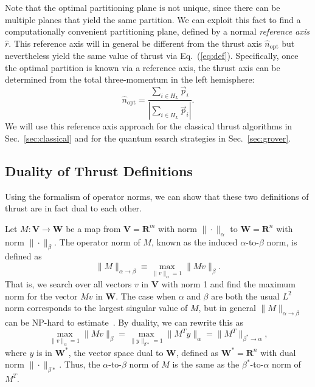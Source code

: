 \documentclass[aps,prd,twocolumn,superscriptaddress,preprintnumbers,nofootinbib,longbibliography,floatfix]{revtex4-1}
\DeclareRobustCommand{\Sec}[1]{Sec.~\ref{#1}}
\DeclareRobustCommand{\Eq}[1]{Eq.~(\ref{#1})}
\newcommand{\opt}{\text{opt}}
\begin{document}
Note that the optimal partitioning plane is not unique, since there can be multiple planes that yield the same partition.
%
We can exploit this fact to find a computationally convenient partitioning plane, defined by a normal \emph{reference axis} $\hat{r}$.
%
This reference axis will in general be different from the thrust axis $\hat{n}_\opt$ but nevertheless yield the same value of thrust via \Eq{eq:def}.
%
Specifically, once the optimal partition is known via a reference axis, the thrust axis can be determined from the total three-momentum in the left hemisphere:
%
\begin{equation}
\label{eq:nopt}
\hat{n}_\opt = \frac{\sum_{i \in H_L} \vec{p}_i}{\left| \sum_{i \in H_L} \vec{p}_i \right|}.
\end{equation}
%
We will use this reference axis approach for the classical thrust algorithms in \Sec{sec:classical} and for the quantum search strategies in \Sec{sec:grover}.



\subsection{Duality of Thrust Definitions}
\label{subsec:duality}


Using the formalism of {operator norms}, we can show that these two definitions of thrust are in fact dual to each other.


Let $M: \mathbf{V} \rightarrow \mathbf{W}$ be a map from $\mathbf{V}=\mathbf{R}^m$ with norm $\|\cdot\|_\alpha$ to $\mathbf{W}=\mathbf{R}^n$ with norm $\|\cdot\|_\beta$.
%
The operator norm of $M$, known as the induced $\alpha$-to-$\beta$ norm, is defined as
%
\begin{equation}
\label{eq:inducednorm}
\|M\|_{\alpha\rightarrow\beta}\equiv\max_{\|v\|_\alpha=1}\|Mv\|_\beta.
\end{equation}
%
That is, we search over all vectors $v$ in $\mathbf{V}$ with norm 1 and find the maximum
norm for the vector $Mv$ in $\mathbf{W}$.
%
The case when $\alpha$ and $\beta$ are both the usual $L^2$ norm corresponds to the
largest singular value of $M$, but in general $\|M\|_{\alpha\rightarrow\beta}$ can be
NP-hard to estimate~\cite{BGGLT18}.
%
By duality, we can rewrite this as
%
\begin{equation}
\max_{\|v\|_\alpha=1}\|Mv\|_\beta=\max_{\|y\|_{\beta*}=1}\|M^T y\|_\alpha = \|M^T\|_{\beta^*\rightarrow \alpha},
\end{equation}
%
where $y$ is in $\mathbf{W}^*$, the vector space dual to $\mathbf{W}$, defined as $\mathbf{W}^*=\mathbf{R}^n$ with dual norm $\|\cdot\|_{\beta*}$.
%
Thus, the $\alpha$-to-$\beta$ norm of $M$ is the same as the $\beta^*$-to-$\alpha$ norm of $M^T$.
\end{document}
